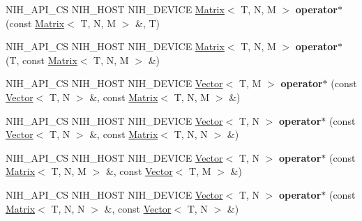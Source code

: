 \begin{DoxyCompactItemize}
\item 
\hypertarget{group__linalg_ga9edaf812fed1fb430494129e31049c9e}{
\-N\-I\-H\-\_\-\-A\-P\-I\-\_\-\-C\-S \-N\-I\-H\-\_\-\-H\-O\-S\-T \-N\-I\-H\-\_\-\-D\-E\-V\-I\-C\-E \*
\hyperlink{structnih_1_1_matrix}{\-Matrix}$<$ \-T, \-N, \-M $>$ {\bfseries operator$\ast$} (const \hyperlink{structnih_1_1_matrix}{\-Matrix}$<$ \-T, \-N, \-M $>$ \&, \-T)}
\label{group__linalg_ga9edaf812fed1fb430494129e31049c9e}

\item 
\hypertarget{group__linalg_ga420f26f0c8944b7baf09ae4e35e532cb}{
\-N\-I\-H\-\_\-\-A\-P\-I\-\_\-\-C\-S \-N\-I\-H\-\_\-\-H\-O\-S\-T \-N\-I\-H\-\_\-\-D\-E\-V\-I\-C\-E \*
\hyperlink{structnih_1_1_matrix}{\-Matrix}$<$ \-T, \-N, \-M $>$ {\bfseries operator$\ast$} (\-T, const \hyperlink{structnih_1_1_matrix}{\-Matrix}$<$ \-T, \-N, \-M $>$ \&)}
\label{group__linalg_ga420f26f0c8944b7baf09ae4e35e532cb}

\item 
\hypertarget{group__linalg_ga75d351600704ea2bc1ac3bc7e957f23e}{
\-N\-I\-H\-\_\-\-A\-P\-I\-\_\-\-C\-S \-N\-I\-H\-\_\-\-H\-O\-S\-T \-N\-I\-H\-\_\-\-D\-E\-V\-I\-C\-E \*
\hyperlink{structnih_1_1_vector}{\-Vector}$<$ \-T, \-M $>$ {\bfseries operator$\ast$} (const \hyperlink{structnih_1_1_vector}{\-Vector}$<$ \-T, \-N $>$ \&, const \hyperlink{structnih_1_1_matrix}{\-Matrix}$<$ \-T, \-N, \-M $>$ \&)}
\label{group__linalg_ga75d351600704ea2bc1ac3bc7e957f23e}

\item 
\hypertarget{group__linalg_ga2080215f8cfbc3d8e28117203bd3f64a}{
\-N\-I\-H\-\_\-\-A\-P\-I\-\_\-\-C\-S \-N\-I\-H\-\_\-\-H\-O\-S\-T \-N\-I\-H\-\_\-\-D\-E\-V\-I\-C\-E \*
\hyperlink{structnih_1_1_vector}{\-Vector}$<$ \-T, \-N $>$ {\bfseries operator$\ast$} (const \hyperlink{structnih_1_1_vector}{\-Vector}$<$ \-T, \-N $>$ \&, const \hyperlink{structnih_1_1_matrix}{\-Matrix}$<$ \-T, \-N, \-N $>$ \&)}
\label{group__linalg_ga2080215f8cfbc3d8e28117203bd3f64a}

\item 
\hypertarget{group__linalg_ga90e49771ff8faf34b8affca8fb924030}{
\-N\-I\-H\-\_\-\-A\-P\-I\-\_\-\-C\-S \-N\-I\-H\-\_\-\-H\-O\-S\-T \-N\-I\-H\-\_\-\-D\-E\-V\-I\-C\-E \*
\hyperlink{structnih_1_1_vector}{\-Vector}$<$ \-T, \-N $>$ {\bfseries operator$\ast$} (const \hyperlink{structnih_1_1_matrix}{\-Matrix}$<$ \-T, \-N, \-M $>$ \&, const \hyperlink{structnih_1_1_vector}{\-Vector}$<$ \-T, \-M $>$ \&)}
\label{group__linalg_ga90e49771ff8faf34b8affca8fb924030}

\item 
\hypertarget{group__linalg_ga02179c82f9486c57d27e245c57a87e53}{
\-N\-I\-H\-\_\-\-A\-P\-I\-\_\-\-C\-S \-N\-I\-H\-\_\-\-H\-O\-S\-T \-N\-I\-H\-\_\-\-D\-E\-V\-I\-C\-E \*
\hyperlink{structnih_1_1_vector}{\-Vector}$<$ \-T, \-N $>$ {\bfseries operator$\ast$} (const \hyperlink{structnih_1_1_matrix}{\-Matrix}$<$ \-T, \-N, \-N $>$ \&, const \hyperlink{structnih_1_1_vector}{\-Vector}$<$ \-T, \-N $>$ \&)}
\label{group__linalg_ga02179c82f9486c57d27e245c57a87e53}


\end{DoxyCompactItemize}
